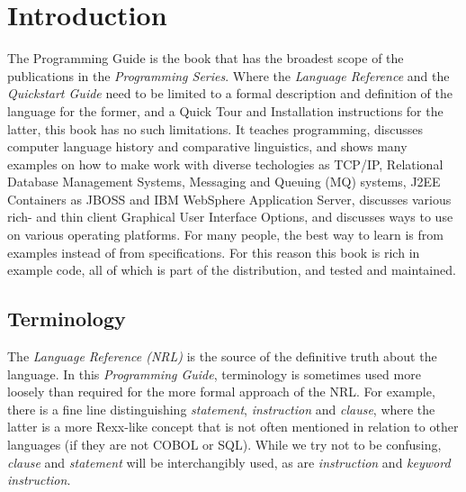 \chapter{Introduction}
The Programming Guide is the book that has the broadest scope of the publications in the \emph{\nr{} Programming Series}. Where the \emph{Language Reference} and the \emph{Quickstart Guide} need to be limited to a formal description and definition of the \nr{} language for the former, and a Quick Tour and Installation instructions for the latter, this book has no such limitations. It teaches programming, discusses computer language history and comparative linguistics, and shows many examples on how to make \nr{} work with diverse techologies as TCP/IP, Relational Database Management Systems, Messaging and Queuing (MQ\textsuperscript{\texttrademark}) systems, J2EE Containers as JBOSS\textsuperscript{\texttrademark} and IBM WebSphere Application Server\textsuperscript{\texttrademark}, discusses various rich- and thin client Graphical User Interface Options, and discusses ways to use \nr{} on various operating platforms. For many people, the best way to learn is from examples instead of from specifications. For this reason this book is rich in example code, all of which is part of the \nr{} distribution, and tested and maintained. 
\section*{Terminology}
The \emph{\nr{} Language Reference (NRL)} is the source of the definitive truth about the language. In this \emph{Programming Guide}, terminology is sometimes used more loosely than required for the more formal approach of the NRL. For example, there is a fine line distinguishing \emph{statement}, \emph{instruction} and \emph{clause}, where the latter is a more Rexx-like concept that is not often mentioned in relation to other languages (if they are not COBOL or SQL). While we try not to be confusing, \emph{clause} and \emph{statement} will be interchangibly used, as are \emph{instruction} and \emph{keyword instruction}.
